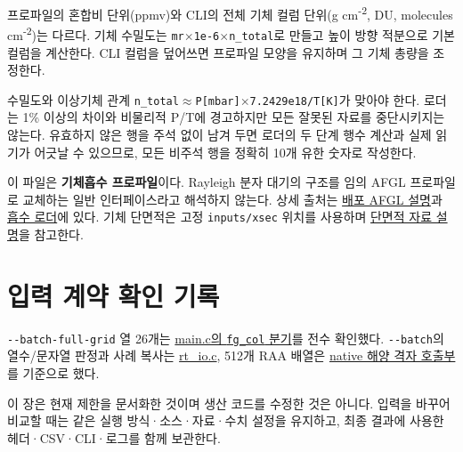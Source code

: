 프로파일의 혼합비 단위(ppmv)와 CLI의 전체 기체 컬럼 단위(g cm\textsuperscript{-}\textsuperscript{2}, DU, molecules cm\textsuperscript{-}\textsuperscript{2})는 다르다. 기체 수밀도는 \texttt{mr\ensuremath{\times}1e-\allowbreak{}6\ensuremath{\times}n\_\allowbreak{}total}로 만들고 높이 방향 적분으로 기본 컬럼을 계산한다. CLI 컬럼을 덮어쓰면 프로파일 모양을 유지하며 그 기체 총량을 조정한다.

수밀도와 이상기체 관계 \texttt{n\_\allowbreak{}total\ensuremath{\approx}P[mbar]\ensuremath{\times}7.\allowbreak{}2429e18/\allowbreak{}T[K]}가 맞아야 한다. 로더는 1\% 이상의 차이와 비물리적 P/T에 경고하지만 모든 잘못된 자료를 중단시키지는 않는다. 유효하지 않은 행을 주석 없이 남겨 두면 로더의 두 단계 행수 계산과 실제 읽기가 어긋날 수 있으므로, 모든 비주석 행을 정확히 10개 유한 숫자로 작성한다.

이 파일은 \textbf{기체흡수 프로파일}이다. Rayleigh 분자 대기의 구조를 임의 AFGL 프로파일로 교체하는 일반 인터페이스라고 해석하지 않는다. 상세 출처는 \href{https://github.com/brtnt/OCRT/blob/54861c68e35ec5aaa3938fad53e93dc2dfa7eb1d/code/OCRT_C/inputs/afgl_atm/README.md}{배포 AFGL 설명}과 \href{https://github.com/brtnt/OCRT/blob/54861c68e35ec5aaa3938fad53e93dc2dfa7eb1d/code/OCRT_C/src/rt_absorption.c\#L46}{흡수 로더}에 있다. 기체 단면적은 고정 \texttt{inputs/\allowbreak{}xsec} 위치를 사용하며 \href{https://github.com/brtnt/OCRT/blob/54861c68e35ec5aaa3938fad53e93dc2dfa7eb1d/code/OCRT_C/inputs/xsec/README.md}{단면적 자료 설명}을 참고한다.

\section{입력 계약 확인 기록}
\label{sec:auto:08_input_formats:6}
\texttt{-\allowbreak{}-\allowbreak{}batch-\allowbreak{}full-\allowbreak{}grid} 열 26개는 \href{https://github.com/brtnt/OCRT/blob/54861c68e35ec5aaa3938fad53e93dc2dfa7eb1d/code/OCRT_C/src/main.c\#L685}{main.c의 \texttt{fg\_\allowbreak{}col} 분기}를 전수 확인했다. \texttt{-\allowbreak{}-\allowbreak{}batch}의 열수/문자열 판정과 사례 복사는 \href{https://github.com/brtnt/OCRT/blob/54861c68e35ec5aaa3938fad53e93dc2dfa7eb1d/code/OCRT_C/src/rt_io.c\#L60}{rt\_io.c}, 512개 RAA 배열은 \href{https://github.com/brtnt/OCRT/blob/54861c68e35ec5aaa3938fad53e93dc2dfa7eb1d/code/OCRT_C/src/main.c\#L1222}{native 해양 격자 호출부}를 기준으로 했다.

이 장은 현재 제한을 문서화한 것이며 생산 코드를 수정한 것은 아니다. 입력을 바꾸어 비교할 때는 같은 실행 방식·소스·자료·수치 설정을 유지하고, 최종 결과에 사용한 헤더·CSV·CLI·로그를 함께 보관한다.

